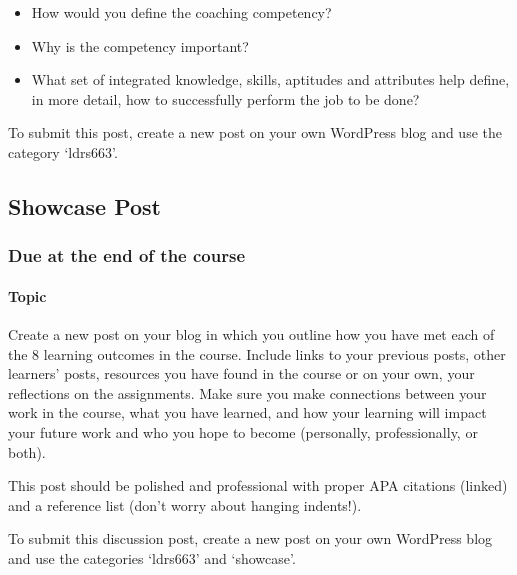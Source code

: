 \documentclass[
]{book}
\providecommand{\tightlist}{%
  \setlength{\itemsep}{0pt}\setlength{\parskip}{0pt}}
\begin{document}
\begin{itemize}
\tightlist
\item
  How would you define the coaching competency?\\
\item
  Why is the competency important?\\
\item
  What set of integrated knowledge, skills, aptitudes and attributes help define, in more detail, how to successfully perform the job to be done?
\end{itemize}

To submit this post, create a new post on your own WordPress blog and use the category `ldrs663'.

\hypertarget{showcase-post}{%
\subsection*{Showcase Post}\label{showcase-post}}

\hypertarget{due-at-the-end-of-the-course}{%
\subsubsection*{Due at the end of the course}\label{due-at-the-end-of-the-course}}

\hypertarget{topic-2}{%
\paragraph*{Topic}\label{topic-2}}

Create a new post on your blog in which you outline how you have met each of the 8 learning outcomes in the course. Include links to your previous posts, other learners' posts, resources you have found in the course or on your own, your reflections on the assignments. Make sure you make connections between your work in the course, what you have learned, and how your learning will impact your future work and who you hope to become (personally, professionally, or both).

This post should be polished and professional with proper APA citations (linked) and a reference list (don't worry about hanging indents!).

To submit this discussion post, create a new post on your own WordPress blog and use the categories `ldrs663' and `showcase'.
\end{document}
